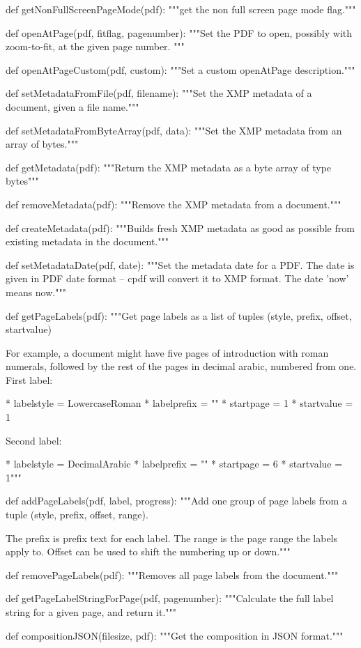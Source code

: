 def getNonFullScreenPageMode(pdf):
    """get the non full screen page mode flag."""

def openAtPage(pdf, fitflag, pagenumber):
    """Set the PDF to open, possibly with zoom-to-fit, at the given page number.
    """

def openAtPageCustom(pdf, custom):
    """Set a custom openAtPage description."""

def setMetadataFromFile(pdf, filename):
    """Set the XMP metadata of a document, given a file name."""

def setMetadataFromByteArray(pdf, data):
    """Set the XMP metadata from an array of bytes."""

def getMetadata(pdf):
    """Return the XMP metadata as a byte array of type bytes"""

def removeMetadata(pdf):
    """Remove the XMP metadata from a document."""

def createMetadata(pdf):
    """Builds fresh XMP metadata as good as possible from existing
    metadata in the document."""

def setMetadataDate(pdf, date):
    """Set the metadata date for a PDF. The date is given in PDF date format --
    cpdf will convert it to XMP format. The date 'now' means now."""

def getPageLabels(pdf):
    """Get page labels as a list of tuples (style, prefix, offset, startvalue)

    For example, a document might have five pages of introduction with roman
    numerals, followed by the rest of the pages in decimal arabic, numbered
    from one. First label:

    * labelstyle = LowercaseRoman
    * labelprefix = ""
    * startpage = 1
    * startvalue = 1

    Second label:

    * labelstyle = DecimalArabic
    * labelprefix = ""
    * startpage = 6
    * startvalue = 1"""

def addPageLabels(pdf, label, progress):
    """Add one group of page labels from a tuple (style, prefix, offset, range).

    The prefix is prefix text for each label. The range is the page range the
    labels apply to. Offset can be used to shift the numbering up or down."""

def removePageLabels(pdf):
    """Removes all page labels from the document."""

def getPageLabelStringForPage(pdf, pagenumber):
    """Calculate the full label string for a given page, and return it."""

def compositionJSON(filesize, pdf):
    """Get the composition in JSON format."""
